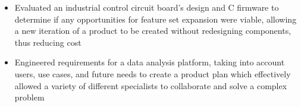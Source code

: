 \documentclass[10pt]{article}
\begin{document}
\begin{flushleft}
\begin{itemize}
		\item Evaluated an industrial control circuit board's design and C firmware to determine if any opportunities for feature set expansion were viable, allowing a new iteration of a product to be created without redesigning components, thus reducing cost

		\item Engineered requirements for a data analysis platform, taking into account users, use cases, and future needs to create a product plan which effectively allowed a variety of different specialists to collaborate and solve a complex problem
    \end{itemize}






\end{flushleft}
\end{document}
